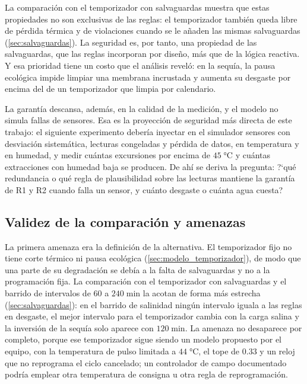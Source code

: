 La comparaci\'on con el temporizador con salvaguardas muestra que estas propiedades no son exclusivas de las reglas: el temporizador tambi\'en queda libre de p\'erdida t\'ermica y de violaciones cuando se le a\~naden las mismas salvaguardas (\cref{sec:salvaguardas}). La seguridad es, por tanto, una propiedad de las salvaguardas, que las reglas incorporan por dise\~no, m\'as que de la l\'ogica reactiva. Y esa prioridad tiene un costo que el an\'alisis revel\'o: en la sequ\'ia, la pausa ecol\'ogica impide limpiar una membrana incrustada y aumenta su desgaste por encima del de un temporizador que limpia por calendario.

La garant\'ia descansa, adem\'as, en la calidad de la medici\'on, y el modelo no simula fallas de sensores. Esa es la proyecci\'on de seguridad m\'as directa de este trabajo: el siguiente experimento deber\'ia inyectar en el simulador sensores con desviaci\'on sistem\'atica, lecturas congeladas y p\'erdida de datos, en temperatura y en humedad, y medir cu\'antas excursiones por encima de $45\;\si{\celsius}$ y cu\'antas extracciones con humedad baja se producen. De ah\'i se deriva la pregunta: ?`qu\'e redundancia o qu\'e regla de plausibilidad sobre las lecturas mantiene la garant\'ia de R1 y R2 cuando falla un sensor, y cu\'anto desgaste o cu\'anta agua cuesta?

\subsection{Validez de la comparaci\'on y amenazas}
\label{sec:validez}
La primera amenaza era la definici\'on de la alternativa. El temporizador fijo no tiene corte t\'ermico ni pausa ecol\'ogica (\cref{sec:modelo_temporizador}), de modo que una parte de su degradaci\'on se deb\'ia a la falta de salvaguardas y no a la programaci\'on fija. La comparaci\'on con el temporizador con salvaguardas y el barrido de intervalos de 60 a $240\;\text{min}$ la acotan de forma m\'as estrecha (\cref{sec:salvaguardas}): en el barrido de salinidad ning\'un intervalo iguala a las reglas en desgaste, el mejor intervalo para el temporizador cambia con la carga salina y la inversi\'on de la sequ\'ia solo aparece con $120\;\text{min}$. La amenaza no desaparece por completo, porque ese temporizador sigue siendo un modelo propuesto por el equipo, con la temperatura de pulso limitada a $44\;\si{\celsius}$, el tope de $0.33$ y un reloj que no reprograma el ciclo cancelado; un controlador de campo documentado podr\'ia emplear otra temperatura de consigna u otra regla de reprogramaci\'on.

